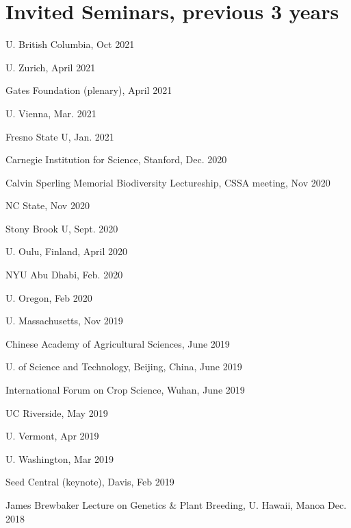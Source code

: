 \documentclass[letterpaper,10pt]{article}
\renewenvironment{itemize}{
  \begin{list}{}{
    \setlength{\leftmargin}{1.5em}
  }
}{
  \end{list}
}
\begin{document}
\section*{Invited Seminars, previous 3 years}
\begin{itemize}
\setlength\itemsep{0ex}
\item U. British Columbia, Oct 2021
\item U. Zurich, April 2021
\item Gates Foundation (plenary), April 2021
\item U. Vienna, Mar. 2021
\item Fresno State U, Jan. 2021
\item Carnegie Institution for Science, Stanford, Dec. 2020
\item Calvin Sperling Memorial Biodiversity Lectureship, CSSA meeting, Nov 2020
\item NC State, Nov 2020
\item Stony Brook U, Sept. 2020
\item U. Oulu, Finland, April 2020
\item NYU Abu Dhabi, Feb. 2020
\item U. Oregon, Feb 2020
\item U. Massachusetts, Nov 2019
\item Chinese Academy of Agricultural Sciences, June 2019
\item U. of Science and Technology, Beijing, China, June 2019
\item International Forum on Crop Science, Wuhan, June 2019
\item UC Riverside, May 2019
\item U. Vermont, Apr 2019
\item U. Washington, Mar 2019
\item Seed Central (keynote), Davis, Feb 2019
\item James Brewbaker Lecture on Genetics \& Plant Breeding, U. Hawaii, Manoa Dec. 2018

\end{itemize}
\end{document}
